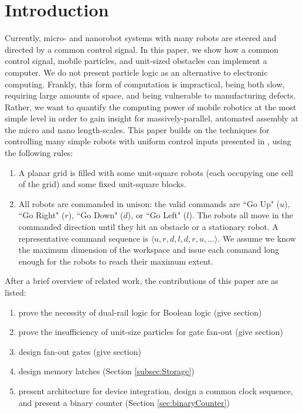 \documentclass[letterpaper, 10 pt, conference]{ieeeconf}
\begin{document}
  \section{Introduction}
    
  
  Currently, micro- and nanorobot systems with many robots are steered and directed by a common control signal\cite{lots}.  In this paper, we show how a common control signal, mobile particles, and unit-sized obstacles can implement a computer.  
    We do not present particle logic as an alternative to electronic computing.
  Frankly, this form of computation is impractical, being both slow, requiring large amounts of space, and being vulnerable to manufacturing defects. Rather, we want to quantify the computing power of mobile robotics at the most simple level in order to gain insight for massively-parallel, automated assembly at the micro and nano length-scales.
  This paper builds on the techniques for controlling many simple robots with uniform control inputs presented in \cite{Becker2013f,Becker2014,Becker2014a}, using the following rules:
    \begin{enumerate}
\item A planar  grid is filled with some unit-square robots (each occupying one cell of the grid)  and some fixed unit-square blocks.
\item All robots are commanded in unison: the valid commands are  ``Go Up" ($u$), ``Go Right" ($r$), ``Go Down" ($d$), or ``Go Left" ($l$).  The robots all move in the commanded direction until they hit an obstacle or a stationary robot.  A representative command sequence is $\langle u,r,d,l,d,r,u,\ldots\rangle$. We assume we know the maximum dimension of the workspace and issue each command long enough for the robots to reach their maximum extent.
\end{enumerate}
  
 After a brief overview of related work,  the contributions of this paper are as listed:
  \begin{enumerate}
  \item prove the necessity of dual-rail logic for Boolean logic (give section)
  \item prove the insufficiency of unit-size particles for gate fan-out (give section)
  \item design {\sc fan-out gates} (give section)
  \item design memory latches (Section \ref{subsec:Storage})
  \item present architecture for device integration, design a common clock sequence, and present a binary counter (Section \ref{sec:binaryCounter})
    \end{enumerate}
  
\end{document}
